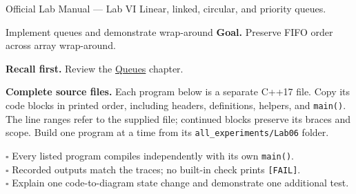 
\begin{sourcealignment}{Official Lab Manual --- Lab VI}
Linear, linked, circular, and priority queues.
\end{sourcealignment}

\begin{labproject}{Implement queues and demonstrate wrap-around}
\textbf{Goal.} Preserve FIFO order across array wrap-around.

\textbf{Recall first.} Review the \hyperref[ch:queues]{Queues} chapter.

\textbf{Complete source files.} Each program below is a separate C++17 file.
Copy its code blocks in printed order, including headers, definitions, helpers, and \texttt{main()}.
The line ranges refer to the supplied file; continued blocks preserve its braces and scope.
Build one program at a time from its \texttt{all\_experiments/Lab06} folder.



\tcbbreak


\tcbbreak


\tcbbreak

\end{labproject}

\begin{verification}
$\square$ Every listed program compiles independently with its own \texttt{main()}.\\
$\square$ Recorded outputs match the traces; no built-in check prints \texttt{[FAIL]}.\\
$\square$ Explain one code-to-diagram state change and demonstrate one additional test.
\end{verification}
